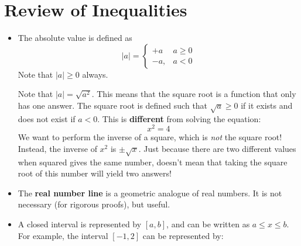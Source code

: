 \section{Review of Inequalities}
\begin{itemize}
    \item The absolute value is defined as
    \begin{equation}
        |a|=\begin{cases}
            +a \,& a \ge 0 \\ 
            -a, & a < 0
        \end{cases}
        \label{eq:}
    \end{equation}
    Note that $|a| \ge 0$ always.
    \begin{warning}
        Note that $|a|=\sqrt{a^2}$. This means that the square root is a function that only has one answer. The square root is defined such that $\sqrt{a} \ge 0$ if it exists and does not exist if $a<0$. This is \textbf{different} from solving the equation:
        \begin{equation}
            x^2=4
            \label{eq:}
        \end{equation}
        We want to perform the inverse of a square, which is \textit{not} the square root! Instead, the inverse of $x^2$ is $\pm \sqrt{x}$. Just because there are two different values when squared gives the same number, doesn't mean that taking the square root of this number will yield two answers!
    \end{warning}
    \item The \textbf{real number line} is a geometric analogue of real numbers. It is not necessary (for rigorous proofs), but useful.
    \item A closed interval is represented by $[a,b]$, and can be written as $a \le x \le b$. For example, the interval $[-1,2]$ can be represented by:
    \begin{center}
\end{center}
\end{itemize}
